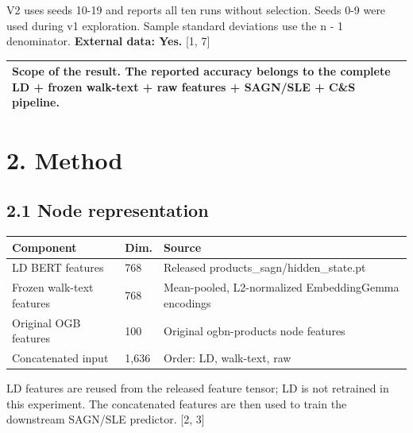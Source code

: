 \documentclass[10pt]{article}
\begin{document}
V2 uses seeds 10-19 and reports all ten runs without selection. Seeds 0-9 were used during v1 exploration. Sample standard deviations use the n - 1 denominator. \textbf{External data: Yes.} [1, 7]\par

\begin{longtable}{@{}p{6.88in}@{}}

\toprule

\textbf{Scope of the result.} The reported accuracy belongs to the complete LD + frozen walk-text + raw features + SAGN/SLE + C\&S pipeline. \\

\bottomrule\end{longtable}

\newpage

\section*{2. Method}

\subsection*{2.1 Node representation}

\begin{longtable}{@{}p{2.033in}p{0.783in}p{3.824in}@{}}

\toprule

Component & Dim. & Source \\

\midrule

LD BERT features & 768 & Released products\_sagn/hidden\_state.pt \\

Frozen walk-text features & 768 & Mean-pooled, L2-normalized EmbeddingGemma encodings \\

Original OGB features & 100 & Original ogbn-products node features \\

Concatenated input & 1,636 & Order: LD, walk-text, raw \\

\bottomrule\end{longtable}

LD features are reused from the released feature tensor; LD is not retrained in this experiment. The concatenated features are then used to train the downstream SAGN/SLE predictor. [2, 3]\par
\end{document}
